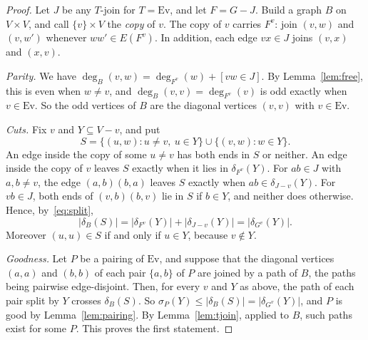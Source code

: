 \documentclass[11pt]{amsart}
\theoremstyle{definition}
\newcommand{\Ev}{\mathrm{Ev}}
\begin{document}
\begin{proof}
Let $J$ be any $T$-join for $T=\Ev$, and let $F=G-J$. Build a graph $B$ on $V\times V$, and call
$\{v\}\times V$ the \emph{copy} of $v$. The copy of $v$ carries $F^v$: join $(v,w)$ and $(v,w')$
whenever $ww'\in E(F^v)$. In addition, each edge $vx\in J$ joins $(v,x)$ and $(x,v)$.

\emph{Parity.} We have $\deg_B(v,w)=\deg_{F^v}(w)+[vw\in J]$. By Lemma~\ref{lem:free}, this is even
when $w\neq v$, and $\deg_B(v,v)=\deg_{F^v}(v)$ is odd exactly when $v\in\Ev$. So the odd vertices of
$B$ are the diagonal vertices $(v,v)$ with $v\in\Ev$.

\emph{Cuts.} Fix $v$ and $Y\subseteq V-v$, and put
\[
S=\{(u,w):u\neq v,\ u\in Y\}\cup\{(v,w):w\in Y\}.
\]
An edge inside the copy of some $u\neq v$ has both ends in $S$ or neither. An edge inside the copy of
$v$ leaves $S$ exactly when it lies in $\delta_{F^v}(Y)$. For $ab\in J$ with $a,b\neq v$, the edge
$(a,b)(b,a)$ leaves $S$ exactly when $ab\in\delta_{J-v}(Y)$. For $vb\in J$, both ends of $(v,b)(b,v)$
lie in $S$ if $b\in Y$, and neither does otherwise. Hence, by~\eqref{eq:split},
\[
|\delta_B(S)|=|\delta_{F^v}(Y)|+|\delta_{J-v}(Y)|=|\delta_{G^v}(Y)|.
\]
Moreover $(u,u)\in S$ if and only if $u\in Y$, because $v\notin Y$.

\emph{Goodness.} Let $P$ be a pairing of $\Ev$, and suppose that the diagonal vertices $(a,a)$ and
$(b,b)$ of each pair $\{a,b\}$ of $P$ are joined by a path of $B$, the paths being pairwise
edge-disjoint. Then, for every $v$ and $Y$ as above, the path of each pair split by $Y$ crosses
$\delta_B(S)$. So $\sigma_P(Y)\le|\delta_B(S)|=|\delta_{G^v}(Y)|$, and $P$ is good by
Lemma~\ref{lem:pairing}. By Lemma~\ref{lem:tjoin}, applied to $B$, such paths exist for some $P$.
This proves the first statement.


\end{proof}
\end{document}
